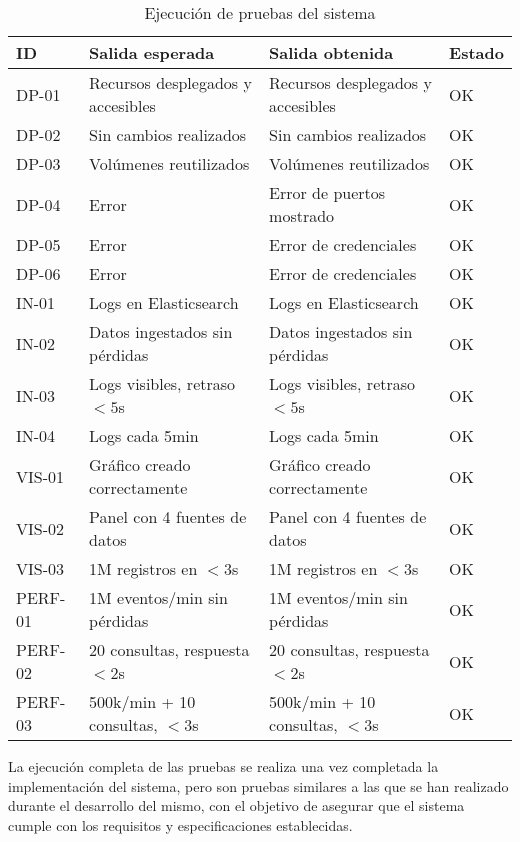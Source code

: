 \begin{table}[H]
    \centering
    \begin{tabular}{|p{}|p{}|p{}|p{}|}
        \hline
        \rowcolor{gray!20}
        ID & Salida esperada & Salida obtenida & Estado \\
        \hline
        DP-01 & Recursos desplegados y accesibles & Recursos desplegados y accesibles & \cellcolor{green!25}OK \\
        \hline
        DP-02 & Sin cambios realizados & Sin cambios realizados & \cellcolor{green!25}OK \\
        \hline
        DP-03 & Volúmenes reutilizados & Volúmenes reutilizados & \cellcolor{green!25}OK \\
        \hline
        DP-04 & Error & Error de puertos mostrado & \cellcolor{green!25}OK \\
        \hline
        DP-05 & Error & Error de credenciales & \cellcolor{green!25}OK \\
        \hline
        DP-06 & Error & Error de credenciales & \cellcolor{green!25}OK \\
        \hline
        IN-01 & Logs en Elasticsearch & Logs en Elasticsearch & \cellcolor{green!25}OK \\
        \hline
        IN-02 & Datos ingestados sin pérdidas & Datos ingestados sin pérdidas & \cellcolor{green!25}OK \\
        \hline
        IN-03 & Logs visibles, retraso $<5$s & Logs visibles, retraso $<5$s & \cellcolor{green!25}OK \\
        \hline
        IN-04 & Logs cada 5min & Logs cada 5min & \cellcolor{green!25}OK \\
        \hline
        VIS-01 & Gráfico creado correctamente & Gráfico creado correctamente & \cellcolor{green!25}OK \\
        \hline
        VIS-02 & Panel con 4 fuentes de datos & Panel con 4 fuentes de datos & \cellcolor{green!25}OK \\
        \hline
        VIS-03 & 1M registros en $<3$s & 1M registros en $<3$s & \cellcolor{green!25}OK \\
        \hline
        PERF-01 & 1M eventos/min sin pérdidas & 1M eventos/min sin pérdidas & \cellcolor{green!25}OK \\
        \hline
        PERF-02 & 20 consultas, respuesta $<2$s & 20 consultas, respuesta $<2$s & \cellcolor{green!25}OK \\
        \hline
        PERF-03 & 500k/min + 10 consultas, $<3$s & 500k/min + 10 consultas, $<3$s & \cellcolor{green!25}OK \\
        \hline
    \end{tabular}
    \caption{Ejecución de pruebas del sistema}
    \label{tab:pruebas}
\end{table}

La ejecución completa de las pruebas se realiza una vez completada la
implementación del sistema, pero son pruebas similares a las que se han
realizado durante el desarrollo del mismo, con el objetivo de asegurar que el
sistema cumple con los requisitos y especificaciones establecidas.
